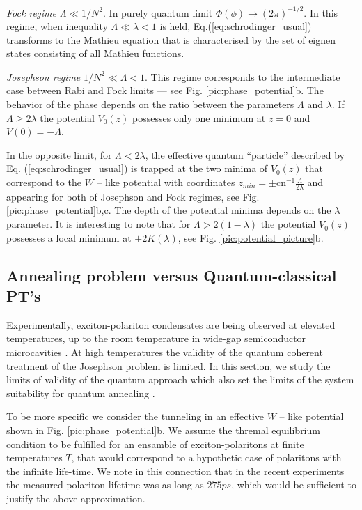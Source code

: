 \documentclass[fleqn,10pt]{wlscirep}
\newcommand{\cn}{\textrm{cn}}
\begin{document}
\textit{Fock regime} $\Lambda \ll 1/N^2$.
In purely quantum limit $\Phi(\phi) \to (2\pi)^{-1/2}$.
In this regime, when inequality $\Lambda \ll \lambda < 1$ is held, Eq.(\ref{eq:schrodinger_usual}) transforms to the Mathieu equation that is characterised by the set of eignen states consisting of all Mathieu functions.

\textit{Josephson regime} $1/N^2\ll\Lambda <1$.
This regime corresponds to the intermediate case between Rabi and Fock limits --- see Fig. \ref{pic:phase_potential}b.
The behavior of the phase depends on the ratio between the parameters $\Lambda$ and $\lambda$.
If $\Lambda \ge 2\lambda$ the potential $V_0(z)$ possesses only one minimum at $z = 0$ and $V(0) = -\Lambda$. 

In the opposite limit, for $\Lambda < 2 \lambda$, the effective quantum ``particle'' described by Eq. (\ref{eq:schrodinger_usual}) is trapped at the two minima of $V_0(z)$ that correspond to the $W$ -- like potential with coordinates $z_{min} = \pm \cn^{-1}{\frac{\Lambda}{2 \lambda}}$ and appearing for both of Josephson and Fock regimes, see Fig. \ref{pic:phase_potential}b,c.  
The depth of the potential minima depends on the $\lambda$ parameter.
It is interesting to note that for $\Lambda > 2(1 - \lambda)$ the potential $V_0(z)$ possesses a local minimum at $\pm 2 K(\lambda)$, see Fig. \ref{pic:potential_picture}b.

\subsection*{Annealing problem versus Quantum-classical PT's \label{sec:quantum_classical}}

Experimentally, exciton-polariton condensates are being observed at elevated temperatures, up to the room temperature in wide-gap semiconductor microcavities \cite{Sanvitto,Guillet}.
At high temperatures the validity of the quantum coherent treatment of the Josephson problem is limited.
In this section, we study the limits of validity of the quantum approach which also set the limits of the system suitability for quantum annealing \cite{Das}.

To be more specific we consider the tunneling in an effective $W$ -- like potential shown in Fig. \ref{pic:phase_potential}b. We assume the thremal equilibrium condition to be fulfilled for an ensamble of exciton-polaritons at finite temperatures $T$, that would correspond to a hypothetic case of polaritons with the infinite life-time.  We note in this connection that in the recent experiments \cite{Snoke_2017} the measured polariton lifetime was as long as $275ps$, which would be sufficient to justify the above approximation.
\end{document}
